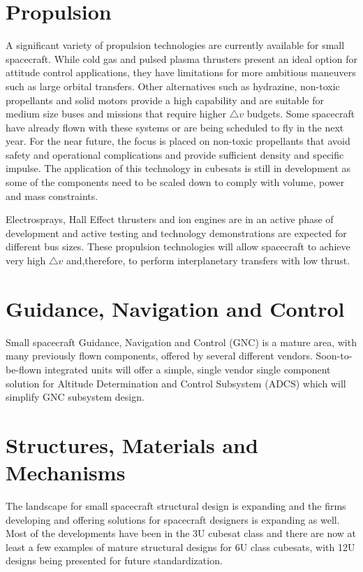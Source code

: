 \section{Propulsion}
A significant variety of propulsion technologies are currently available for small spacecraft. While cold gas and pulsed plasma thrusters present an ideal option for attitude control applications, they have limitations for more ambitious maneuvers such as large orbital transfers. Other alternatives such as hydrazine, non-toxic propellants and solid motors provide a high capability and are suitable for medium size buses and missions that require higher $ \bigtriangleup v $ budgets. Some spacecraft have already flown with these systems or are being scheduled to fly in the next year. For the near future, the focus is placed on non-toxic propellants that avoid safety and operational complications and provide sufficient density and specific impulse. The application of this technology in cubesats is still in development as some of the components need to be scaled down to comply with volume, power and mass constraints.

Electrosprays, Hall Effect thrusters and ion engines are in an active phase of development and active testing and technology demonstrations are expected for different bus sizes. These propulsion technologies will allow spacecraft to achieve very high $ \bigtriangleup v $ and,therefore, to perform interplanetary transfers with low thrust.


\section{Guidance, Navigation and Control}
Small spacecraft Guidance, Navigation and Control (GNC) is a mature area, with many previously flown components, offered by several different vendors. Soon-to-be-flown integrated units will offer a simple, single vendor single component solution for Altitude Determination and Control Subsystem (ADCS) which will simplify GNC subsystem design. 

\section{Structures, Materials and Mechanisms}
The landscape for small spacecraft structural design is expanding and the firms developing and offering solutions for spacecraft designers is expanding as well. Most of the developments have been in the 3U cubesat class and there are now at least a few examples of mature structural designs for 6U class cubesats, with 12U designs being presented for future standardization. 


